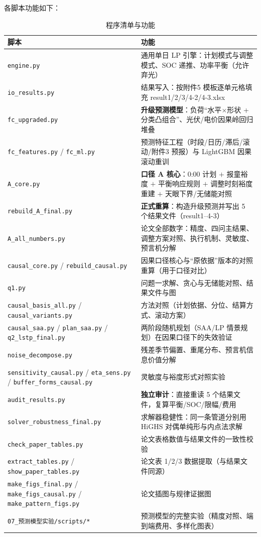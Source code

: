 \documentclass[withoutpreface,bwprint]{cumcmthesis}
\begin{document}
\begin{enumerate}[label=(\arabic*), leftmargin=2.4em, itemsep=1pt]
各脚本功能如下：

\begin{table}[htbp]
\centering
\caption{程序清单与功能}
\label{tab:code}
\begin{tabularx}{\textwidth}{@{}p{4.6cm}X@{}}
\toprule
脚本 & 功能 \\
\midrule
\texttt{engine.py} & 通用单日 LP 引擎：计划模式与调整模式、SOC 递推、功率平衡（允许弃光） \\
\texttt{io\_results.py} & 结果写入：按附件5 模板逐单元格填充 result1/2/3/4-2/4-3.xlsx \\
\texttt{fc\_upgraded.py} & \textbf{升级预测模型}：负荷“水平$\times$形状 + 分类凸组合”、光伏/电价因果岭回归堆叠 \\
\texttt{fc\_features.py} / \texttt{fc\_ml.py} & 预测特征工程（时段/日历/滞后/滚动/附件3 预报）与 LightGBM 因果滚动重训 \\
\texttt{A\_core.py} & \textbf{口径 A 核心}：0:00 计划 $+$ 报童裕度 $+$ 平衡响应规则 $+$ 调整时刻裕度重建 $+$ 天眼下界/无储能对照 \\
\texttt{rebuild\_A\_final.py} & \textbf{正式重算}：构造升级预测并写出 5 个结果文件（result1--4-3） \\
\texttt{A\_all\_numbers.py} & 论文全部数字：精度、四问主结果、调整方案对照、执行机制、灵敏度、预言机分解 \\
\texttt{causal\_core.py} / \texttt{rebuild\_causal.py} & 因果口径核心与“原依据”版本的对照重算（用于口径对比） \\
\texttt{q1.py} & 问题一求解、贪心与无储能对照、结果文件与图 \\
\texttt{causal\_basis\_all.py} / \texttt{causal\_variants.py} & 方法对照（计划依据、分位、结算方式、滚动方案） \\
\texttt{causal\_saa.py} / \texttt{plan\_saa.py} / \texttt{q2\_lstp\_final.py} & 两阶段随机规划（SAA/LP 情景规划）在因果口径下的失效验证 \\
\texttt{noise\_decompose.py} & 残差季节偏置、重尾分布、预言机信息价值分解 \\
\texttt{sensitivity\_causal.py} / \texttt{eta\_sens.py} / \texttt{buffer\_forms\_causal.py} & 灵敏度与裕度形式对照实验 \\
\texttt{audit\_results.py} & \textbf{独立审计}：直接重读 5 个结果文件，复算平衡/SOC/限幅/费用 \\
\texttt{solver\_robustness\_\allowbreak final.py} & 求解器稳健性：同一条管道分别用 HiGHS 对偶单纯形与内点法求解 \\
\texttt{check\_paper\_tables.py} & 论文表格数值与结果文件的一致性校验 \\
\texttt{extract\_tables.py} / \texttt{show\_paper\_tables.py} & 论文表 1/2/3 数据提取（与结果文件同源） \\
\texttt{make\_figs\_final.py} / \texttt{make\_figs\_causal.py} / \texttt{make\_pattern\_figs.py} & 论文插图与规律证据图 \\
\texttt{07\_预测模型实验/scripts/*} & 预测模型的完整实验（精度对照、端到端费用、多样化图表） \\
\bottomrule
\end{tabularx}
\end{table}


\end{enumerate}
\end{document}
